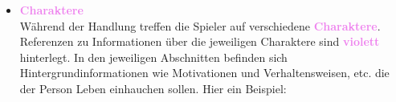 \begin{itemize}
  \item \textcolor{violet}{\textbf{Charaktere}} \\
  Während der Handlung treffen die Spieler auf verschiedene \textcolor{violet}{\textbf{Charaktere}}. Referenzen zu Informationen über
  die jeweiligen Charaktere sind \textcolor{violet}{\textbf{violett}} hinterlegt. In den jeweiligen Abschnitten befinden sich
  Hintergrundinformationen wie Motivationen und Verhaltensweisen, etc. die der Person Leben einhauchen sollen. Hier ein
  Beispiel:

  \begin{centering}
    \noindent{}
  \end{centering}

\end{itemize}

